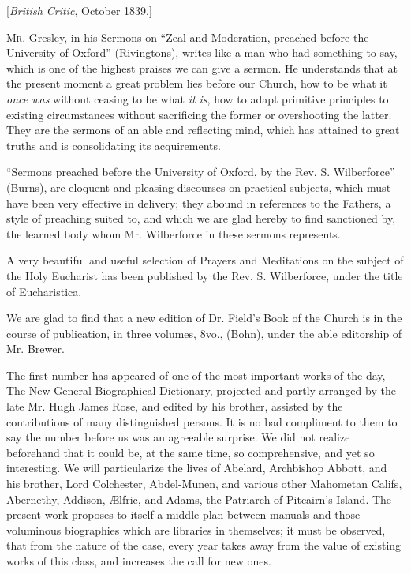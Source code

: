 
[\emph{British Critic}, October 1839.]

M\textsc{r}. Gresley, in his
Sermons on ``Zeal and Moderation, preached before the University of
Oxford'' (Rivingtons), writes like a man who had something to say, which
is one of the highest praises we can give a sermon. He understands that
at the present moment a great problem lies before our Church, how to be
what it \emph{once was} without
ceasing to be what \emph{it is}, how to adapt primitive principles to
existing circumstances without sacrificing the former or overshooting
the latter. They are the sermons of an able and reflecting mind, which
has attained to great truths and is consolidating its acquirements.

``Sermons preached before the University of Oxford,
by the Rev. S. Wilberforce'' (Burns), are eloquent and pleasing
discourses on practical subjects, which must have been very effective in
delivery; they abound in references to the Fathers, a style of preaching
suited to, and which we are glad hereby to find sanctioned by, the
learned body whom Mr. Wilberforce in these sermons represents.

A very beautiful and useful selection of Prayers
and Meditations on the subject of the Holy Eucharist has been published
by the Rev. S. Wilberforce, under the title of Eucharistica.

We are glad to find that a new edition of Dr. Field's
Book of the Church is in the course of publication, in three volumes,
8vo., (Bohn), under the able editorship of Mr. Brewer.

The first number has appeared of one of the most
important works of the day, The New General Biographical Dictionary,
projected and partly arranged by the late Mr. Hugh James Rose, and
edited by his brother, assisted by the contributions of many
distinguished persons. It is no bad compliment to them to say the number
before us was an agreeable surprise. We did not realize beforehand that
it could be, at the same time, so comprehensive, and yet so interesting.
We will particularize the lives of Abelard, Archbishop Abbott, and his
brother, Lord Colchester, Abdel-Munen, and various other Mahometan
Califs, Abernethy, Addison, Ælfric, and Adams, the Patriarch of
Pitcairn's Island. The present work proposes to itself a middle plan
between manuals and those voluminous biographies which are libraries in
themselves; it must be observed, that from the nature of the case, every
year takes away from the value of existing works of this class, and
increases the call for new ones.

